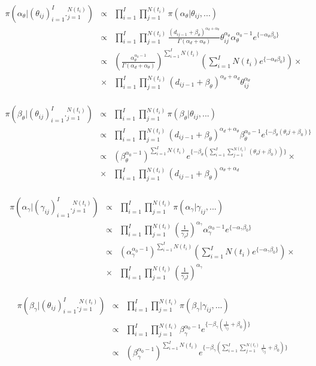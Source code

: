 \\
\begin{eqnarray*}
\pi(\alpha_\theta|(\theta_{ij})_{i=1}^I ._{j=1}^{N(t_i)})&\propto & \prod_{i=1}^I \prod_{j=1}^{N(t_i)} \pi(\alpha_\theta|\theta_{ij},...)\\
&\propto &\prod_{i=1}^I \prod_{j=1}^{N(t_i)} \frac{(d_{ij-1}+\beta_\theta)^{\alpha_d+\alpha_\theta}}{\Gamma(\alpha_d+\alpha_\theta)} \theta_{ij}^{\alpha_\theta}\alpha_\theta^{\alpha_0-1}e^{\{-\alpha_\theta\beta_0\}}\\
&\propto & (\frac{\alpha_\theta^{\alpha_0 -1}}{\Gamma(\alpha_d+\alpha_\theta)})^{\sum_{i=1}^I N(t_i)} (\sum_{i=1}^I N(t_i) e^{\{-\alpha_\theta\beta_0\}}) \times \\
&\times & \prod_{i=1}^I \prod_{j=1}^{N(t_i)} (d_{ij-1}+\beta_\theta)^{\alpha_\theta+\alpha_d} \theta_{ij}^{\alpha_\theta}
\end{eqnarray*}
\\
\begin{eqnarray*}
\pi(\beta_\theta|(\theta_{ij})_{i=1}^I ._{j=1}^{N(t_i)})&\propto & \prod_{i=1}^I \prod_{j=1}^{N(t_i)} \pi(\beta_\theta|\theta_{ij},...)\\
&\propto &\prod_{i=1}^I \prod_{j=1}^{N(t_i)} (d_{ij-1}+\beta_\theta)^{\alpha_d+\alpha_\theta}\beta_\theta^{\alpha_0-1} e^{\{-\beta_\theta(\theta_ij+\beta_0)\}}\\
&\propto & (\beta_\theta^{\alpha_0-1})^{\sum_{i=1}^I N(t_i)} e^{\{-\beta_\theta(\sum_{i=1}^I \sum_{j=1}^{N(t_i)}(\theta_ij+\beta_0))\}} \times \\
&\times & \prod_{i=1}^I \prod_{j=1}^{N(t_i)} (d_{ij-1}+\beta_\theta)^{\alpha_\theta+\alpha_d}
\end{eqnarray*}
\\
\begin{eqnarray*}
\pi(\alpha_\gamma|(\gamma_{ij})_{i=1}^I ._{j=1}^{N(t_i)})&\propto & \prod_{i=1}^I \prod_{j=1}^{N(t_i)} \pi(\alpha_\gamma|\gamma_{ij},...)\\
&\propto & \prod_{i=1}^I \prod_{j=1}^{N(t_i)} (\frac{1}{\gamma_ij})^{\alpha_\gamma} \alpha_\gamma^{\alpha_0-1}e^{\{-\alpha_\gamma\beta_0\}}\\
&\propto & (\alpha_\gamma^{\alpha_0-1})^{\sum_{i=1}^I N(t_i)} (\sum_{i=1}^I N(t_i) e^{\{-\alpha_\gamma \beta_0\}}) \times \\
&\times & \prod_{i=1}^I \prod_{j=1}^{N(t_i)}(\frac{1}{\gamma_ij})^{\alpha_\gamma}
\end{eqnarray*}
\\
\begin{eqnarray*}
\pi(\beta_\gamma|(\theta_{ij})_{i=1}^I ._{j=1}^{N(t_i)})&\propto & \prod_{i=1}^I \prod_{j=1}^{N(t_i)} \pi(\beta_\gamma|\gamma_{ij},...)\\
&\propto & \prod_{i=1}^I \prod_{j=1}^{N(t_i)} \beta_\gamma^{\alpha_0-1}e^{\{-\beta_\gamma(\frac{1}{\gamma_{ij}}+\beta_0)\}}\\
&\propto & (\beta_\gamma^{\alpha_0-1})^{\sum_{i=1}^I N(t_i)} e^{\{-\beta_\gamma(\sum_{i=1}^I \sum_{j=1}^{N(t_i)}\frac{1}{\gamma_{ij}}+\beta_0)\}}
\end{eqnarray*}
